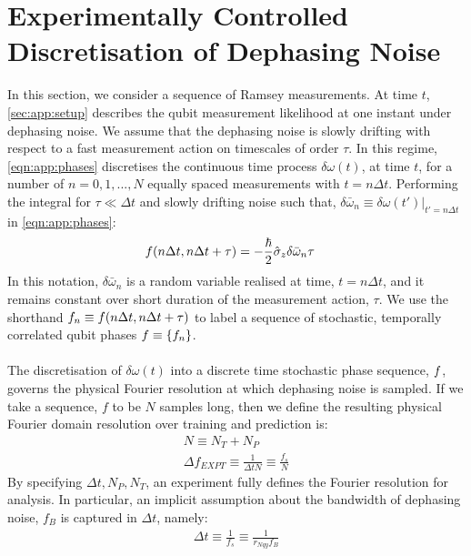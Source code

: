 \section{Experimentally Controlled Discretisation of Dephasing Noise \label{sec:app:exptres}} 
 In this section, we consider a sequence of Ramsey measurements. At time $t$, \cref{sec:app:setup} describes the qubit measurement likelihood at one instant under dephasing noise. We assume that the dephasing noise is slowly drifting with respect to a fast measurement action on timescales of order $\tau$. In this regime, \cref{eqn:app:phases} discretises the continuous time process $\delta\omega(t)$, at time $t$, for a number of $n= 0, 1, ..., N$ equally spaced measurements with $t = n \Delta t$. Performing the integral for $\tau \ll \Delta t$ and slowly drifting noise such that, $\delta\bar{\omega}_n \equiv \delta\omega(t')|_{t'=n \Delta t }$ in \cref{eqn:app:phases}:
\begin{align}
f(n\Delta t, n\Delta t + \tau) & = -\frac{\hbar}{2}\hat{\sigma}_{z}\delta\bar{\omega}_n \tau \label{eqn:app:phases_constantdetuning}
\end{align}
In this notation, $\delta\bar{\omega}_n $ is a random variable realised at time, $t = n \Delta t$, and it remains constant over short duration of the measurement action, $\tau$.  We use the shorthand $f_n \equiv f(n\Delta t, n\Delta t + \tau)$ to label a sequence of stochastic, temporally correlated qubit phases $ f \equiv \{f_n \}$. 
 \\
 \\
 The discretisation of $\delta\omega(t)$ into  a discrete time stochastic phase sequence, $f$, governs the physical Fourier resolution at which dephasing noise is sampled. If we take a sequence, $f$ to be $N$ samples long,
 then we define the resulting physical Fourier domain resolution over training and prediction is:
 \begin{align}
 N \equiv N_T + N_P \\
 \Delta f_{EXPT} \equiv \frac{1}{\Delta t N} \equiv \frac{f_s}{N}
 \end{align}
By specifying  $\Delta t, N_P, N_T$, an experiment fully defines the Fourier resolution for analysis. In particular, an implicit assumption about the bandwidth of dephasing noise, $f_B$ is captured in $\Delta t$, namely:
\begin{align}
\Delta t \equiv \frac{1}{f_s} \equiv \frac{1}{r_{Nqy}f_B}
 \end{align}
